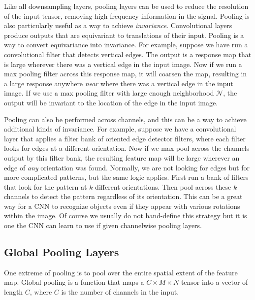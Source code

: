 Like all downsampling layers, pooling layers can be used to reduce the resolution of the input tensor, removing high-frequency information in the signal. Pooling is also particularly useful as a way to achieve \textit{invariance}. Convolutional layers produce outputs that are equivariant to translations of their input. Pooling is a way to convert equivariance into invariance. For example, suppose we have run a convolutional filter that detects vertical edges. The output is a response map that is large wherever there was a vertical edge in the input image. Now if we run a max pooling filter across this response map, it will coarsen the map, resulting in a large response anywhere \textit{near} where there was a vertical edge in the input image. If we use a max pooling filter with large enough neighborhood $\mathcal{N}$, the output will be invariant to the location of the edge in the input image.

Pooling can also be performed across channels, and this can be a way to achieve additional kinds of invariance. For example, suppose we have a convolutional layer that applies a filter bank of oriented edge detector filters, where each filter looks for edges at a different orientation. Now if we max pool across the channels output by this filter bank, the resulting feature map will be large wherever an edge of \textit{any} orientation was found. Normally, we are not looking for edges but for more complicated patterns, but the same logic applies. First run a bank of filters that look for the pattern at $k$ different orientations. Then pool across these $k$ channels to detect the pattern regardless of its orientation. This can be a great way for a CNN to recognize objects even if they appear with various rotations within the image. Of course we usually do not hand-define this strategy but it is one the CNN can learn to use if given channelwise pooling layers.



\subsection{Global Pooling Layers}

One extreme of pooling is to pool over the entire spatial extent of the feature map. Global pooling is a function that maps a $C \times M \times N$ tensor into a vector of length $C$, where $C$ is the number of channels in the input. 

